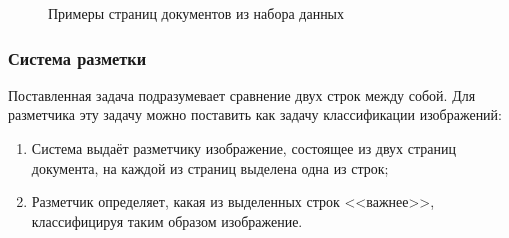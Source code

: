\begin{figure}[h]
\begin{minipage}[h]{0.22\linewidth}
    \end{minipage}
    \caption{Примеры страниц документов из набора данных}
    \label{fig:documentexamples}
\end{figure}


\subsubsection{Система разметки}

Поставленная задача подразумевает сравнение двух строк между собой.
Для разметчика эту задачу можно поставить как задачу классификации изображений:
\begin{enumerate}
    \item Система выдаёт разметчику изображение, состоящее из двух страниц документа, на каждой из страниц выделена одна из строк;
    \item Разметчик определяет, какая из выделенных строк <<важнее>>, классифицируя таким образом изображение.
\end{enumerate}

